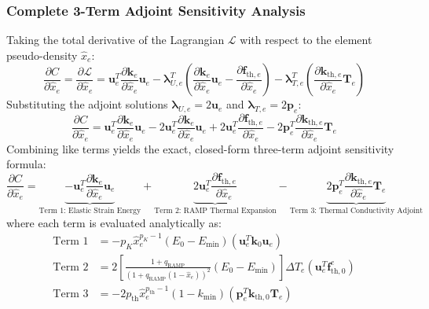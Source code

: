 \documentclass[11pt, a4paper]{article}
\begin{document}
\subsubsection{Complete 3-Term Adjoint Sensitivity Analysis}
Taking the total derivative of the Lagrangian $\mathcal{L}$ with respect to the element pseudo-density $\hat{x}_e$:
\begin{equation}
\frac{\partial C}{\partial \hat{x}_e} = \frac{\partial \mathcal{L}}{\partial \hat{x}_e} = \mathbf{u}_e^T \frac{\partial \mathbf{k}_e}{\partial \hat{x}_e} \mathbf{u}_e - \boldsymbol{\lambda}_{U, e}^T \left( \frac{\partial \mathbf{k}_e}{\partial \hat{x}_e} \mathbf{u}_e - \frac{\partial \mathbf{f}_{\text{th}, e}}{\partial \hat{x}_e} \right) - \boldsymbol{\lambda}_{T, e}^T \left( \frac{\partial \mathbf{k}_{\text{th}, e}}{\partial \hat{x}_e} \mathbf{T}_e \right)
\end{equation}
Substituting the adjoint solutions $\boldsymbol{\lambda}_{U, e} = 2 \mathbf{u}_e$ and $\boldsymbol{\lambda}_{T, e} = 2 \mathbf{p}_e$:
\begin{equation}
\frac{\partial C}{\partial \hat{x}_e} = \mathbf{u}_e^T \frac{\partial \mathbf{k}_e}{\partial \hat{x}_e} \mathbf{u}_e - 2 \mathbf{u}_e^T \frac{\partial \mathbf{k}_e}{\partial \hat{x}_e} \mathbf{u}_e + 2 \mathbf{u}_e^T \frac{\partial \mathbf{f}_{\text{th}, e}}{\partial \hat{x}_e} - 2 \mathbf{p}_e^T \frac{\partial \mathbf{k}_{\text{th}, e}}{\partial \hat{x}_e} \mathbf{T}_e
\end{equation}
Combining like terms yields the exact, closed-form three-term adjoint sensitivity formula:
\begin{equation}
\frac{\partial C}{\partial \hat{x}_e} = \underbrace{- \mathbf{u}_e^T \frac{\partial \mathbf{k}_e}{\partial \hat{x}_e} \mathbf{u}_e}_{\text{Term 1: Elastic Strain Energy}} + \underbrace{2 \mathbf{u}_e^T \frac{\partial \mathbf{f}_{\text{th}, e}}{\partial \hat{x}_e}}_{\text{Term 2: RAMP Thermal Expansion}} - \underbrace{2 \mathbf{p}_e^T \frac{\partial \mathbf{k}_{\text{th}, e}}{\partial \hat{x}_e} \mathbf{T}_e}_{\text{Term 3: Thermal Conductivity Adjoint}}
\end{equation}
where each term is evaluated analytically as:
\begin{align}
\text{Term 1} &= - p_K \hat{x}_e^{p_K - 1} (E_0 - E_{\min}) \left( \mathbf{u}_e^T \mathbf{k}_0 \mathbf{u}_e \right) \\[4pt]
\text{Term 2} &= 2 \left[ \frac{1 + q_{\text{RAMP}}}{\left(1 + q_{\text{RAMP}}(1 - \hat{x}_e)\right)^2} (E_0 - E_{\min}) \right] \Delta T_e \left( \mathbf{u}_e^T \mathbf{f}_{\text{th}, 0}^e \right) \\[4pt]
\text{Term 3} &= - 2 p_{\text{th}} \hat{x}_e^{p_{\text{th}} - 1} (1 - k_{\min}) \left( \mathbf{p}_e^T \mathbf{k}_{\text{th}, 0} \mathbf{T}_e \right)
\end{align}
\end{document}
